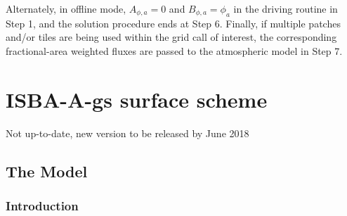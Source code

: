 {\begin{enumerate}
\end{enumerate}

Alternately, in offline mode, $A_{\phi,a}=0$ and $B_{\phi,a}=\phi_a$
in the driving routine in Step 1, and the solution procedure ends at
Step 6. Finally, if multiple patches and/or tiles are being used within
the grid call of interest, the corresponding 
fractional-area weighted fluxes are
passed to the atmospheric model in Step 7.


\clearpage

\section{ISBA-A-gs surface scheme}{Not up-to-date, new version to be released by June 2018}


\subsection{The Model}

\subsubsection{Introduction}

}

